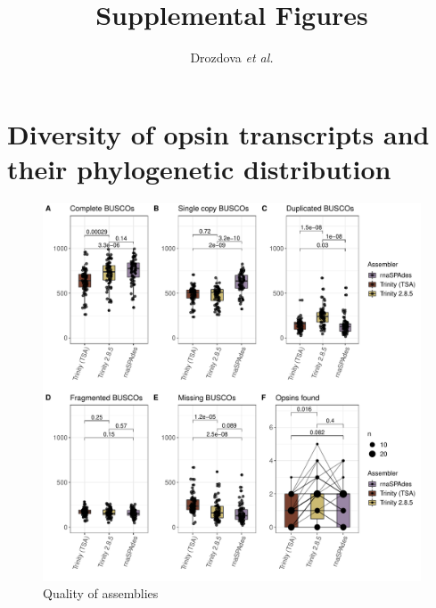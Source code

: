 \documentclass{article}
\begin{document}
	
\title{Supplemental Figures} %
\author{Drozdova \textit{et al.}} %
\maketitle

\section{Diversity of opsin transcripts and their phylogenetic distribution}

\begin{figure}[H] 
\hskip -1cm \includegraphics[scale=0.8]{./FigS1_assembly_comparison.pdf}
	\caption{Quality of assemblies} \end{figure}
\end{document}
